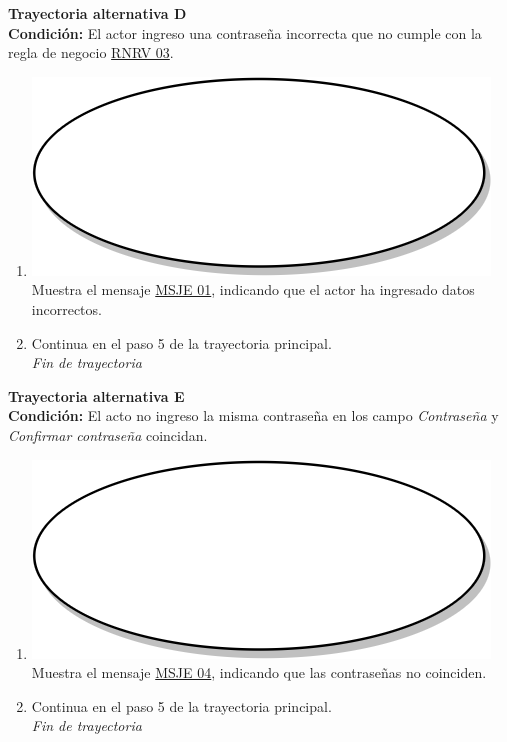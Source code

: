 \textbf{Trayectoria alternativa D} \label{cu2_ta_d}\\
\textbf{Condición:} El actor ingreso una contraseña incorrecta que no cumple con la regla de negocio \hyperref[rnrv_03]{RNRV 03}.\\
 \begin{enumerate}[label=D\arabic*]
    \item {\includegraphics[scale=.05]{Capitulo3/img/proceso.png} Muestra el mensaje \hyperref[msje_01]{MSJE 01}, indicando que el actor ha ingresado datos incorrectos.}
    \item {Continua en el paso 5 de la trayectoria principal.} \\
    \textit{Fin de trayectoria} \\
\end{enumerate}

\textbf{Trayectoria alternativa E} \label{cu2_ta_e}\\
\textbf{Condición:} El acto no ingreso la misma contraseña en los campo \textit{Contraseña} y \textit{Confirmar contraseña} coincidan.\\
 \begin{enumerate}[label=E\arabic*]
    \item {\includegraphics[scale=.05]{Capitulo3/img/proceso.png} Muestra el mensaje \hyperref[msje_04]{MSJE 04}, indicando que las contraseñas no coinciden.}
    \item {Continua en el paso 5 de la trayectoria principal.} \\
    \textit{Fin de trayectoria} \\
\end{enumerate}

